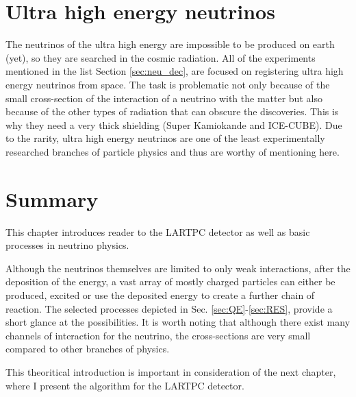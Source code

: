 \section{Ultra high energy neutrinos}

The neutrinos of the ultra high energy are impossible to be produced on earth (yet), so they are searched in the cosmic radiation. All of the experiments mentioned in the list Section \ref{sec:neu_dec}, are focused on registering ultra high energy neutrinos from space. The task is problematic not only because of the small cross-section of the interaction of a neutrino with the matter but also because of the other types of radiation that can obscure the discoveries. This is why they need a very thick shielding (Super Kamiokande and ICE-CUBE).
Due to the rarity, ultra high energy neutrinos are one of the least experimentally researched branches of particle physics and thus are worthy of mentioning here.


\section{Summary}

This chapter introduces reader to the LARTPC detector as well as basic processes in neutrino physics.

Although the neutrinos themselves are limited to only weak interactions, after the deposition of the energy, a vast array of mostly charged particles can either be produced, excited or use the deposited energy to create a further chain of reaction.
The selected processes depicted in Sec. \ref{sec:QE}-\ref{sec:RES}, provide a short glance at the possibilities.
It is worth noting that although there exist many channels of interaction for the neutrino, the cross-sections are very small compared to other branches of physics.

This theoritical introduction is important in consideration of the next chapter, where I present the algorithm for the LARTPC detector.

